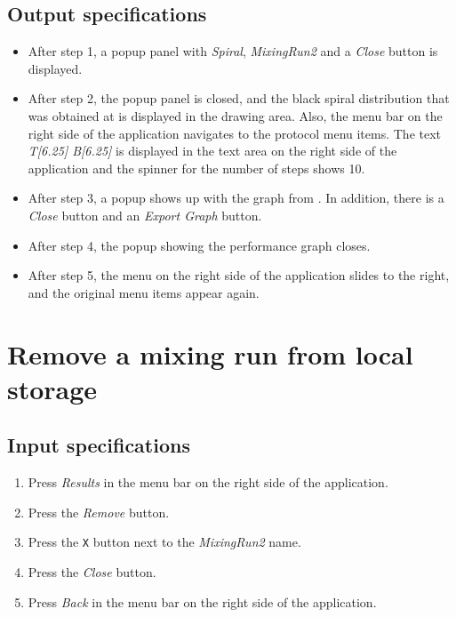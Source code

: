 \subsection*{Output specifications}
\begin{itemize}
\item After step 1, a popup panel with \emph{Spiral}, \emph{MixingRun2} and a \emph{Close} button is displayed.
\item After step 2, the popup panel is closed, and the black spiral distribution that was obtained at  is displayed in the drawing area. Also, the menu bar on the right side of the application navigates to the protocol menu items. The text \emph{T[6.25] B[6.25]} is displayed in the text area on the right side of the application and the spinner for the number of steps shows 10.
\item After step 3, a popup shows up with the graph from . In addition, there is a \emph{Close} button and an \emph{Export Graph} button.
\item After step 4, the popup showing the performance graph closes.
\item After step 5, the menu on the right side of the application slides to the right, and the original menu items appear again.
\end{itemize}

\section{Remove a mixing run from local storage}

\subsection*{Input specifications}
\begin{enumerate}
\item Press \emph{Results} in the menu bar on the right side of the application.
\item Press the \emph{Remove} button.
\item Press the \texttt{X} button next to the \emph{MixingRun2} name.
\item Press the \emph{Close} button.
\item Press \emph{Back} in the menu bar on the right side of the application.
\end{enumerate}

